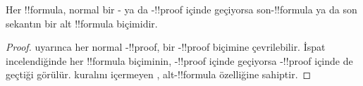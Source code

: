 \begin{cor}
Her !!{formula}, normal bir - ya da -!!{proof}
içinde geçiyorsa son-!!{formula} ya da son sekantın bir alt
!!{formula} biçimidir.
\end{cor}

\begin{proof}
   uyarınca her normal
  -!!{proof}, bir -!!{proof} biçimine çevrilebilir.
  İspat incelendiğinde her !!{formula} biçiminin,
  -!!{proof} içinde geçiyorsa -!!{proof} içinde de
  geçtiği görülür.
  \Cut{} kuralını içermeyen , alt-!!{formula} özelliğine
  sahiptir.
\end{proof}

